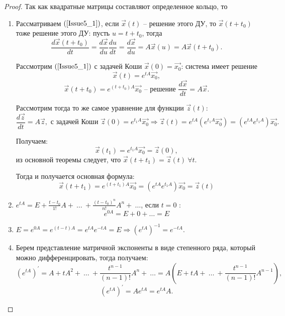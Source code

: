 \begin{proof}
    Так как квадратные матрицы составляют определенное кольцо, то \\

    \begin{enumerate}
        \item Рассматриваем $(\ref{Issue5_1})$, если $\overrightarrow{x}(t)$ -- решение этого ДУ, то $\overrightarrow{x}(t+t_0)$ тоже решение этого ДУ: пусть $u = t + t_0$, тогда
        \[ \frac{d\overrightarrow{x}(t+t_0)}{dt} = \frac{d\overrightarrow{x}}{du}\frac{du}{dt} = \frac{d\overrightarrow{x}}{du} = A\overrightarrow{x}(u) = A\overrightarrow{x}(t+t_0).\]

        Рассмотрим $(\ref{Issue5_1})$ с задачей Коши $\overrightarrow{x}(0) = \overrightarrow{x_0}$: система имеет решение
        \[ \overrightarrow{x}(t) =  e^{tA}\overrightarrow{x_0},\]
        \[ \overrightarrow{x}(t+t_0) = e^{(t+t_0)A}\overrightarrow{x_0}\text{ -- решение }\frac{d\overrightarrow{x}}{dt} = A\overrightarrow{x}. \]

        Рассмотрим тогда то же самое уравнение для функции $\overrightarrow{z}(t)$:
        \[ \frac{d\overrightarrow{z}}{dt} = A\overrightarrow{z}, \text{ с задачей Коши } \overrightarrow{z}(0) = e^{t_1A}\overrightarrow{x_0} \Rightarrow \overrightarrow{z}(t) = e^{tA} (e^{t_1A}\overrightarrow{x_0}) = (e^{tA}e^{t_1A})\overrightarrow{x_0}.\]

        Получаем:
        \[ \overrightarrow{x}(t_1) = e^{t_1A}\overrightarrow{x_0} = \overrightarrow{z}(0),\]
        из основной теоремы следует, что $\overrightarrow{x}(t+t_1) = \overrightarrow{z}(t)\ \forall t$.

        Тогда и получается основная формула:
        \[ \overrightarrow{x}(t+t_1) = e^{(t+t_1)A}\overrightarrow{x_0} = (e^{tA}e^{t_1A})\overrightarrow{x_0} = \overrightarrow{z}(t)\]

        \item $ e^{tA} = E + \frac{t-t_0}{1!}A +\ \dots\ + \frac{(t-t_0)^n}{n!}A^n+\ \dots $, если $t = 0$ :
        \[ e^{0A} = E + 0 + \dots = E\]

        \item $E = e^{0A} = e^{(t-t)A} = e^{tA}e^{-tA} = E \Rightarrow \left(e^{tA}\right)^{-1} = e^{-tA}.$

        \item Берем представление матричной экспоненты в виде степенного ряда, который можно дифференцировать, тогда получаем:
        \[ (e^{tA})^{'} = A + tA^2 +\ \dots\ +\frac{t^{n-1}}{(n-1)!} A^n +\ \dots = A\left(E + tA +\ \dots\ + \frac{t^{n-1}}{(n-1)!}A^{n-1}\right),\]
        \[ (e^{tA})^{'} = Ae^{tA} = e^{tA}A.\]
    \end{enumerate}

\end{proof}

